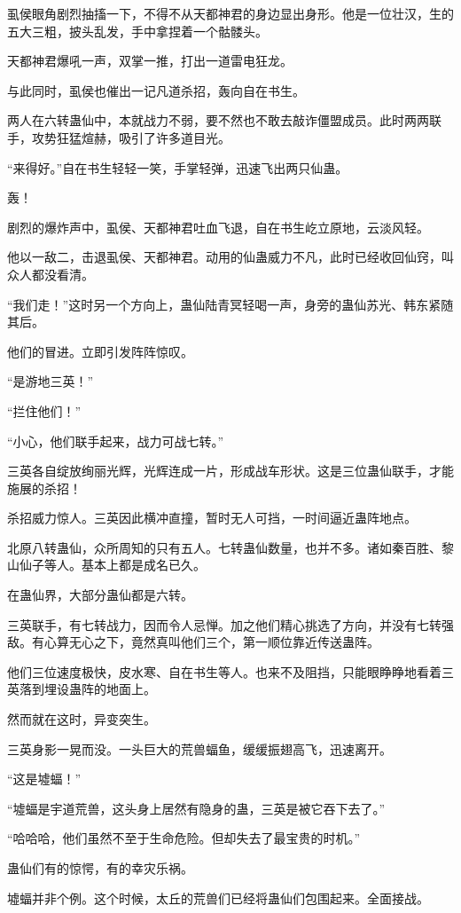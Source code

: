 \begin{this_body}
虱侯眼角剧烈抽搐一下，不得不从天都神君的身边显出身形。他是一位壮汉，生的五大三粗，披头乱发，手中拿捏着一个骷髅头。

天都神君爆吼一声，双掌一推，打出一道雷电狂龙。

与此同时，虱侯也催出一记凡道杀招，轰向自在书生。

两人在六转蛊仙中，本就战力不弱，要不然也不敢去敲诈僵盟成员。此时两两联手，攻势狂猛煊赫，吸引了许多道目光。

“来得好。”自在书生轻轻一笑，手掌轻弹，迅速飞出两只仙蛊。

轰！

剧烈的爆炸声中，虱侯、天都神君吐血飞退，自在书生屹立原地，云淡风轻。

他以一敌二，击退虱侯、天都神君。动用的仙蛊威力不凡，此时已经收回仙窍，叫众人都没看清。

“我们走！”这时另一个方向上，蛊仙陆青冥轻喝一声，身旁的蛊仙苏光、韩东紧随其后。

他们的冒进。立即引发阵阵惊叹。

“是游地三英！”

“拦住他们！”

“小心，他们联手起来，战力可战七转。”

三英各自绽放绚丽光辉，光辉连成一片，形成战车形状。这是三位蛊仙联手，才能施展的杀招！

杀招威力惊人。三英因此横冲直撞，暂时无人可挡，一时间逼近蛊阵地点。

北原八转蛊仙，众所周知的只有五人。七转蛊仙数量，也并不多。诸如秦百胜、黎山仙子等人。基本上都是成名已久。

在蛊仙界，大部分蛊仙都是六转。

三英联手，有七转战力，因而令人忌惮。加之他们精心挑选了方向，并没有七转强敌。有心算无心之下，竟然真叫他们三个，第一顺位靠近传送蛊阵。

他们三位速度极快，皮水寒、自在书生等人。也来不及阻挡，只能眼睁睁地看着三英落到埋设蛊阵的地面上。

然而就在这时，异变突生。

三英身影一晃而没。一头巨大的荒兽蝠鱼，缓缓振翅高飞，迅速离开。

“这是墟蝠！”

“墟蝠是宇道荒兽，这头身上居然有隐身的蛊，三英是被它吞下去了。”

“哈哈哈，他们虽然不至于生命危险。但却失去了最宝贵的时机。”

蛊仙们有的惊愕，有的幸灾乐祸。

墟蝠并非个例。这个时候，太丘的荒兽们已经将蛊仙们包围起来。全面接战。


\end{this_body}
